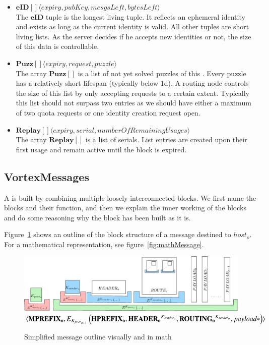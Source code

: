 \begin{itemize}
	\item $\mathbf{eID[]}\langle expiry, pubKey, mesgsLeft, bytesLeft \rangle$\\
	The $\mathbf{eID}$ tuple is the longest living tuple. It reflects an ephemeral identity and exists as long as the current identity is valid. All other tuples are short living lists. As the server decides if he accepts new identities or not, the size of this data is controllable. 
	\item $\mathbf{Puzz[]}\langle expiry, request, puzzle \rangle$\\
	The array $\mathbf{Puzz[]}$ is a list of not yet solved puzzles of this . Every puzzle has a relatively short lifespan (typically below 1d). A routing node controls the size of this list by only accepting requests to a certain extent. Typically this list should not surpass two entries as we should have either a maximum of two quota requests or one identity creation request open.
	\item $\mathbf{Replay[]}\langle expiry, serial, numberOfRemainingUsages \rangle$\\
	The array $\mathbf{Replay[]}$ is a list of serials. List entries are created upon their first usage and remain active until the block is expired. 
\end{itemize}


\subsection{VortexMessages}\label{sec:vortexMessage}
A \VortexMessage{} is built by combining multiple loosely interconnected blocks. We first name the blocks and their function, and then we explain the inner working of the blocks and do some reasoning why the block has been built as it is. 

Figure~\ref{fig:messageOutline} shows an outline of the block structure of a message destined to $host_o$. For a mathematical representation, see figure~\ref{fig:mathMessage}.

\begin{figure}[ht]
	\includegraphics[width=\textwidth]{inc/blockLayoutSimplified}
	$\splitatcommas{\langle \mathbf{MPREFIX_o}, E_{K_{peer_{o+1}}}\left( \mathbf{HPREFIX_o}, \mathbf{HEADER_o}^{K_{sender_o}}, \mathbf{ROUTING_o}^{K_{sender_o}}, payload* \right) \rangle}$
	\caption{Simplified message outline visually and in math}
	\label{fig:messageOutline}
\end{figure}

